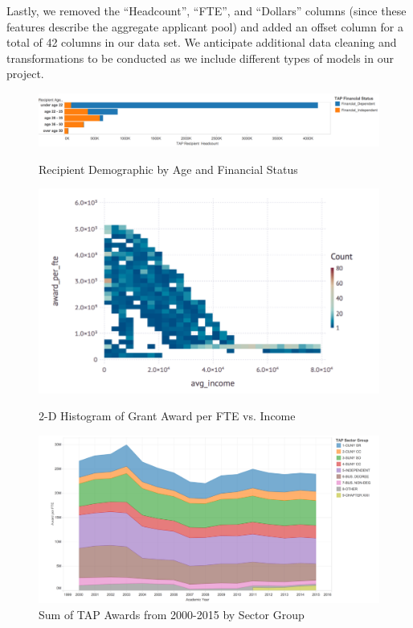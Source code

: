 \documentclass[11pt, fleqn]{article}
\begin{document}
Lastly, we removed the ``Headcount'', ``FTE'', and ``Dollars'' columns (since these features describe the aggregate applicant pool) and added an offset column for a total of 42 columns in our data set. We anticipate additional data cleaning and transformations to be conducted as we include different types of models in our project.

\begin{figure}
	\begin{center}
	\includegraphics[scale = 0.30]{financial_status.png}
	\caption{Recipient Demographic by Age and Financial Status}
	\end{center}
	\begin{minipage}[c]{0.4\linewidth}
		\includegraphics[width=\linewidth]{avgincome_vs_award.png}
		\caption{2-D Histogram of Grant Award per FTE vs. Income}
	\end{minipage}
	\hfill
	\begin{minipage}[c]{0.5\linewidth}
		\includegraphics[width=\linewidth]{sector_group.png}
		\vspace{-0.5cm}
		\caption{Sum of TAP Awards from 2000-2015 by Sector Group}
	\end{minipage}
\end{figure}
\end{document}
